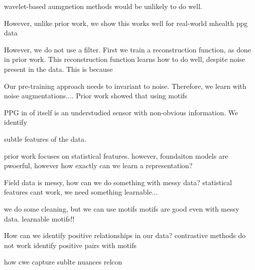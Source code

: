 wavelet-based aumgnetion methods would be unlikely to do well. 

However, unlike prior work, we show this works well for real-world mhealth ppg data



However, we do not use a filter. First we train a reconstruction function, as done in prior work. This reconstruction function learns how to do well, despite noise present in the data. This is because 

Our pre-training approach needs to invariant to noise. Therefore, we learn with noise augmentations.... 
Prior work showed that using motifs 

PPG in of itself is an understudied sensor with non-obvious information. We identify 

subtle features of the data.

prior work focuses on statistical features. however, foundaiton models are pwoerful, however how exactly can we learn a representation?

Field data is messy, how can we do something with messy data? statistical features cant work, we need something learnable...

we do some cleaning, but we can use motifs motifs are good even with messy data. learnable motifs!!

How can we identify positive relationships in our data? contrastive methods do not work
identify positive pairs with motifs

how cwe capture sublte nuances
relcon








